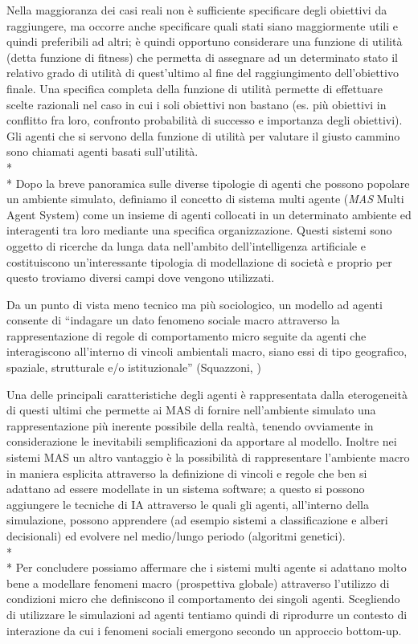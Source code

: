 Nella maggioranza dei casi reali non è sufficiente specificare degli obiettivi da raggiungere, ma occorre anche specificare quali stati siano maggiormente utili e quindi preferibili ad altri; è quindi opportuno considerare una funzione di utilità (detta funzione di fitness) che permetta di assegnare ad un determinato stato il relativo grado di utilità di quest'ultimo al fine del raggiungimento dell'obiettivo finale. Una specifica completa della funzione di utilità permette di effettuare scelte razionali nel caso in cui i soli obiettivi non bastano (es. più obiettivi in conflitto fra loro, confronto probabilità di successo e importanza degli obiettivi). Gli agenti che si servono della funzione di utilità per valutare il giusto cammino sono chiamati agenti basati sull'utilità.
\\* \\*
Dopo la breve panoramica sulle diverse tipologie di agenti che possono popolare un ambiente simulato, definiamo il concetto di sistema multi agente (\emph{MAS} Multi Agent System) come un insieme di agenti collocati in un determinato ambiente ed interagenti tra loro mediante una specifica organizzazione. Questi sistemi sono oggetto di ricerche da lunga data nell'ambito dell'intelligenza artificiale e costituiscono un'interessante tipologia di modellazione di società e proprio per questo troviamo diversi campi dove vengono utilizzati.

Da un punto di vista meno tecnico ma più sociologico, un modello ad agenti consente di ``indagare un dato fenomeno sociale macro attraverso la rappresentazione di regole di comportamento micro seguite da agenti che interagiscono all'interno di vincoli ambientali macro, siano essi di tipo geografico, spaziale, strutturale e/o istituzionale'' (Squazzoni, \cite{Squazzoni})

Una delle principali caratteristiche degli agenti è rappresentata dalla eterogeneità di questi ultimi che permette ai MAS di fornire nell'ambiente simulato una rappresentazione più inerente possibile della realtà, tenendo ovviamente in considerazione le inevitabili semplificazioni da apportare al modello. Inoltre nei sistemi MAS un altro vantaggio è la possibilità di rappresentare l'ambiente macro in maniera esplicita attraverso la definizione di vincoli e regole che ben si adattano ad essere modellate in un sistema software; a questo si possono aggiungere le tecniche di IA attraverso le quali gli agenti, all'interno della simulazione, possono apprendere (ad esempio sistemi a classificazione e alberi decisionali) ed evolvere nel medio/lungo periodo (algoritmi genetici).\\*\\*
Per concludere possiamo affermare che i sistemi multi agente si adattano molto bene a modellare fenomeni macro (prospettiva globale) attraverso l'utilizzo di condizioni micro che definiscono il comportamento dei singoli agenti. Scegliendo di utilizzare le simulazioni ad agenti tentiamo quindi di riprodurre un contesto di interazione da cui i fenomeni sociali emergono secondo un approccio bottom-up.



